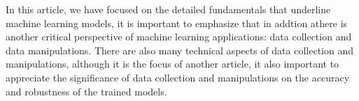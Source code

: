 
\par
In this article, we have focused on the detailed fundamentals that underline machine learning models, it is important to emphasize that in addtion athere is another critical perspective of machine learning applications: data collection and data manipulations. There are also many technical aspects of data collection and manipulations, although it is the focus of another article, it also important to appreciate the significance of data collection and manipulations on the accuracy and robustness of the trained models.
\par 
